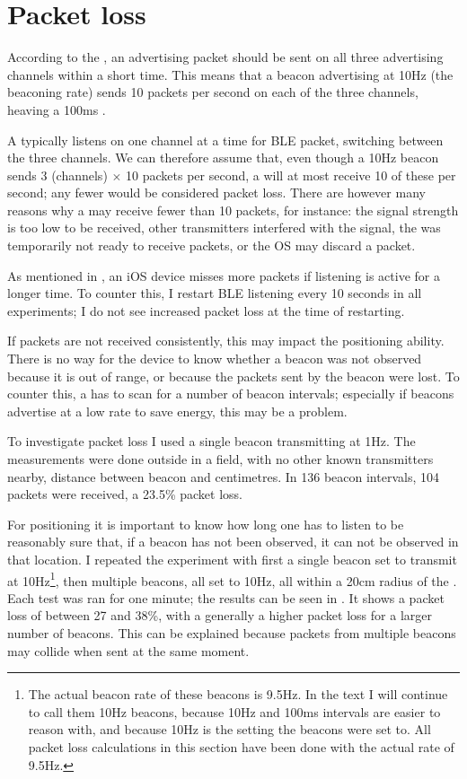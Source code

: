 \section{Packet loss}
\label{sec:rss-packet-loss}
According to the \BTspec, an advertising packet should be sent on all three advertising channels within a short time.
This means that a beacon advertising at 10Hz (the beaconing rate) sends 10 packets per second on each of the three channels, heaving a 100ms .

A \device typically listens on one channel at a time for BLE packet, switching between the three channels.
We can therefore assume that, even though a 10Hz beacon sends 3 (channels) $\times$ 10 packets per second, a \device will at most receive 10 of these per second; any fewer would be considered packet loss.
There are however many reasons why a \device may receive fewer than 10 packets, for instance:
the signal strength is too low to be received, other transmitters interfered with the signal, the \device was temporarily not ready to receive packets, or the OS may discard a packet.

As mentioned in , an iOS device misses more packets if \BLE listening is active for a longer time.
To counter this, I restart BLE listening every 10 seconds in all experiments; I do not see increased packet loss at the time of restarting.

If packets are not received consistently, this may impact the positioning ability.
There is no way for the device to know whether a beacon was not observed because it is out of range, or because the packets sent by the beacon were lost.
To counter this, a \device has to scan for a number of beacon intervals; especially if beacons advertise at a low rate to save energy, this may be a problem.

To investigate packet loss I used a single beacon transmitting at 1Hz.
The measurements were done outside in a field, with no other known transmitters nearby, distance between beacon and  centimetres.
In 136 beacon intervals, 104 packets were received, a 23.5\% packet loss.

For positioning it is important to know how long one has to listen to be reasonably sure that, if a beacon has not been observed, it can not be observed in that location.
I repeated the experiment with first a single beacon set to transmit at 10Hz\footnote{The actual beacon rate of these beacons is 9.5Hz. In the text I will continue to call them 10Hz beacons, because 10Hz and 100ms intervals are easier to reason with, and because 10Hz is the setting the beacons were set to. All packet loss calculations in this section have been done with the actual rate of 9.5Hz.}, then multiple beacons, all set to 10Hz, all within a 20cm radius of the \device.
Each test was ran for one minute; the results can be seen in .
It shows a packet loss of between 27 and 38\%, with a generally a higher packet loss for a larger number of beacons.
This can be explained because packets from multiple beacons may collide when sent at the same moment.

